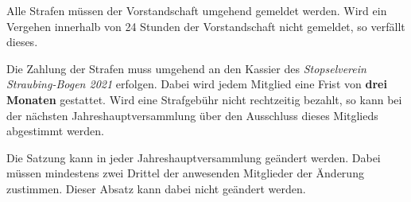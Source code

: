 \documentclass[a4paper,12pt]{scrartcl}
\newcommand{\vereinsName}{Stopselverein Straubing-Bogen 2021}
\begin{document}
    Alle Strafen müssen der Vorstandschaft umgehend gemeldet werden.
    Wird ein Vergehen innerhalb von 24 Stunden der Vorstandschaft nicht gemeldet,
    so verfällt dieses.

    Die Zahlung der Strafen muss umgehend an den Kassier des \emph{\vereinsName} erfolgen.
    Dabei wird jedem Mitglied eine Frist von \textbf{drei Monaten} gestattet.
    Wird eine Strafgebühr nicht rechtzeitig bezahlt,
    so kann bei der nächsten Jahreshauptversammlung über den Ausschluss dieses Mitglieds abgestimmt werden.

    Die Satzung kann in jeder Jahreshauptversammlung geändert werden.
    Dabei müssen mindestens zwei Drittel der anwesenden Mitglieder der Änderung zustimmen.
    Dieser Absatz kann dabei nicht geändert werden.

    \clearpage
    \appendix

    
\end{document}
